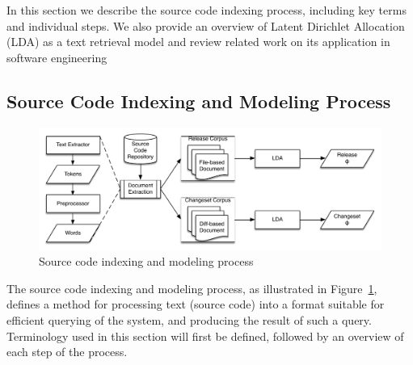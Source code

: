 
%
In this section we describe the source code indexing process,
including key terms and individual steps.
We also provide an overview of Latent Dirichlet Allocation (LDA) as a text retrieval model
and review related work on its application in software engineering

\subsection{Source Code Indexing and Modeling Process}

\begin{figure}[ht]
\centering
\centerline{\includegraphics[width=.75\textwidth]{changeset}}
\caption{Source code indexing and modeling process}
\label{fig:process}
\end{figure}



The source code indexing and modeling process,
as illustrated in Figure~\ref{fig:process},
defines a method for processing text (source code) into
a format suitable for efficient querying of the system, and
producing the result of such a query.
Terminology used in this section will first be defined, followed by an overview of each step of the process.

